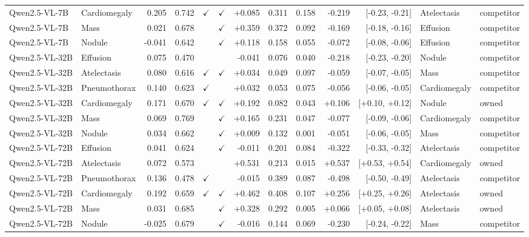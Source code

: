 \begin{longtable}{llrrccrrrrrll}
Qwen2.5-VL-7B & Cardiomegaly & 0.205 & 0.742 & $\checkmark$ & $\checkmark$ & +0.085 & 0.311 & 0.158 & -0.219 & [-0.23, -0.21] & Atelectasis & competitor \\
Qwen2.5-VL-7B & Mass & 0.021 & 0.678 &  & $\checkmark$ & +0.359 & 0.372 & 0.092 & -0.169 & [-0.18, -0.16] & Effusion & competitor \\
Qwen2.5-VL-7B & Nodule & -0.041 & 0.642 &  & $\checkmark$ & +0.118 & 0.158 & 0.055 & -0.072 & [-0.08, -0.06] & Effusion & competitor \\
Qwen2.5-VL-32B & Effusion & 0.075 & 0.470 &  &  & -0.041 & 0.076 & 0.040 & -0.218 & [-0.23, -0.20] & Nodule & competitor \\
Qwen2.5-VL-32B & Atelectasis & 0.080 & 0.616 & $\checkmark$ & $\checkmark$ & +0.034 & 0.049 & 0.097 & -0.059 & [-0.07, -0.05] & Mass & competitor \\
Qwen2.5-VL-32B & Pneumothorax & 0.140 & 0.623 & $\checkmark$ &  & +0.032 & 0.053 & 0.075 & -0.056 & [-0.06, -0.05] & Cardiomegaly & competitor \\
\rowcolor{cfSlate2}Qwen2.5-VL-32B & Cardiomegaly & 0.171 & 0.670 & $\checkmark$ & $\checkmark$ & +0.192 & 0.082 & 0.043 & +0.106 & [+0.10, +0.12] & Nodule & owned \\
Qwen2.5-VL-32B & Mass & 0.069 & 0.769 &  & $\checkmark$ & +0.165 & 0.231 & 0.047 & -0.077 & [-0.09, -0.06] & Cardiomegaly & competitor \\
Qwen2.5-VL-32B & Nodule & 0.034 & 0.662 &  & $\checkmark$ & +0.009 & 0.132 & 0.001 & -0.051 & [-0.06, -0.05] & Mass & competitor \\
Qwen2.5-VL-72B & Effusion & 0.041 & 0.624 &  & $\checkmark$ & -0.011 & 0.201 & 0.084 & -0.322 & [-0.33, -0.32] & Atelectasis & competitor \\
\rowcolor{cfSlate2}Qwen2.5-VL-72B & Atelectasis & 0.072 & 0.573 &  &  & +0.531 & 0.213 & 0.015 & +0.537 & [+0.53, +0.54] & Cardiomegaly & owned \\
Qwen2.5-VL-72B & Pneumothorax & 0.136 & 0.478 & $\checkmark$ &  & -0.015 & 0.389 & 0.087 & -0.498 & [-0.50, -0.49] & Atelectasis & competitor \\
\rowcolor{cfSlate2}Qwen2.5-VL-72B & Cardiomegaly & 0.192 & 0.659 & $\checkmark$ & $\checkmark$ & +0.462 & 0.408 & 0.107 & +0.256 & [+0.25, +0.26] & Atelectasis & owned \\
\rowcolor{cfSlate2}Qwen2.5-VL-72B & Mass & 0.031 & 0.685 &  & $\checkmark$ & +0.328 & 0.292 & 0.005 & +0.066 & [+0.05, +0.08] & Atelectasis & owned \\
Qwen2.5-VL-72B & Nodule & -0.025 & 0.679 &  & $\checkmark$ & -0.016 & 0.144 & 0.069 & -0.230 & [-0.24, -0.22] & Mass & competitor \\

\end{longtable}
